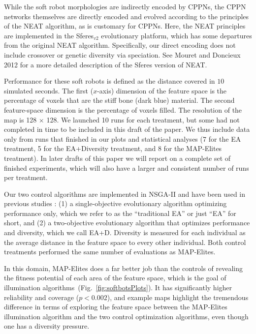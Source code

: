 \documentclass[twocolumn, DIV25, 9pt]{scrartcl}
\begin{document}
While the soft robot morphologies are indirectly encoded by CPPNs, the CPPN networks themselves are directly encoded and evolved according to the principles of the NEAT algorithm\cite{stanley2002evolving}, as is customary for CPPNs\cite{stanley2007compositional, stanley2009hypercube, gauci2010autonomous, clune2011performance, yosinski2011gaits, lee2013evolving, cheney2013unshackling, cheney2014evolved}. Here, the NEAT principles are implemented in the Sferes$_{v2}$\cite{mouret2010sferesv2} evolutionary platform, which has some departures from the original NEAT algorithm. Specifically, our direct encoding does not include crossover or genetic diversity via speciation. See Mouret and Doncieux 2012\cite{Mouret2012} for a more detailed description of the Sferes version of NEAT.

Performance for these soft robots is defined as the distance covered in $10$ simulated seconds. The first ($x$-axis) dimension of the feature space is the percentage of voxels that are the stiff bone (dark blue) material. The second feature-space dimension is the percentage of voxels filled. The resolution of the map is 128 $\times$ 128. We launched 10 runs for each treatment, but some had not completed in time to be included in this draft of the paper. We thus include data only from runs that finished in our plots and statistical analyses (7 for the EA treatment, 5 for the EA+Diversity treatment, and 8 for the MAP-Elites treatment). In later drafts of this paper we will report on a complete set of finished experiments, which will also have a larger and consistent number of runs per treatment. 

Our two control algorithms are implemented in NSGA-II and have been used in previous studies \cite{Mouret2012,tarapore2015evolvability}: (1) a single-objective evolutionary algorithm optimizing performance only, which we refer to as the ``traditional EA'' or just ``EA'' for short, and (2) a two-objective evolutionary algorithm that optimizes performance and diversity, which we call EA+D. Diversity is measured for each individual as the average distance in the feature space to every other individual. Both control treatments performed the same number of evaluations as MAP-Elites.

In this domain, MAP-Elites does a far better job than the controls of revealing the fitness potential of each area of the feature space, which is the goal of illumination algorithms~(Fig.~\ref{fig:softbotsPlots}). It has significantly higher reliability and coverage ($p<0.002$), and example maps highlight the tremendous difference in terms of exploring the feature space between the MAP-Elites illumination algorithm and the two control optimization algorithms, even though one has a diversity pressure.
\end{document}

